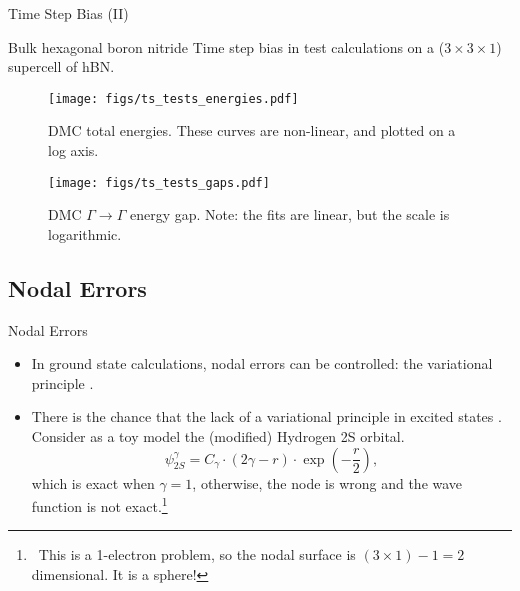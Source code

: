 \documentclass[12pt, pdf, hyperref={draft}, usenames, dvipsnames,
aspectratio=169]{beamer}
\newcommand{\blue}[1]{{\bf\color{NavyBlue}{#1}}}
\newcommand{\green}[1]{{\bf\color{ForestGreen}{#1}}}
\begin{document}
\begin{frame}{Time Step Bias (II)}
\begin{block}{Bulk hexagonal boron nitride}
Time step bias in test calculations on a ($3\times3\times1$) supercell of
hBN.\@
\begin{minipage}[t]{0.49\textwidth}
\begin{figure}[H]
  \centering
  \texttt{[image: figs/ts\_tests\_energies.pdf]}
  \caption{DMC total energies. These curves are non-linear, and plotted on a
  log axis.}\label{fig:ts_energies}
\end{figure}
\end{minipage}%
\hfill
\begin{minipage}[t]{0.49\textwidth}
\begin{figure}[H]
  \centering
  \texttt{[image: figs/ts\_tests\_gaps.pdf]}
  \caption{DMC $\Gamma \rightarrow \Gamma$ energy gap. Note: the fits are
  linear, but the scale is logarithmic.}\label{fig:ts_gaps}
\end{figure}
\end{minipage}%
\end{block}
\end{frame}

\subsection{Nodal Errors}\label{sub:nodal_errors}

\begin{frame}{Nodal Errors}

\begin{itemize}

  \item In ground state calculations, nodal errors can be controlled: the
  variational principle \green{keeps us safe}.

  \item There is the chance that the lack of a variational principle in excited
  states \blue{causes us problems}. Consider as a toy model the (modified)
  Hydrogen 2S orbital.
  \begin{equation}
    \psi^{\gamma}_{2S} = C_{\gamma} \cdot (2\gamma - r)
    \cdot \exp{\left(-\dfrac{r}{2}\right)},
  \end{equation}
  which is exact when $\gamma = 1$, otherwise, the node is wrong and the
  wave function is not exact.\footnote{\ This is a 1-electron problem, so the
  nodal surface is $(3 \times 1) - 1 = 2$ dimensional. It is a sphere!}

\end{itemize}
\end{frame}
\end{document}
